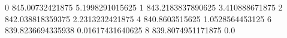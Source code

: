 0 845.00732421875 5.1998291015625
1 843.2183837890625 3.410888671875
2 842.038818359375 2.2313232421875
4 840.8603515625 1.0528564453125
6 839.8236694335938 0.01617431640625
8 839.8074951171875 0.0

